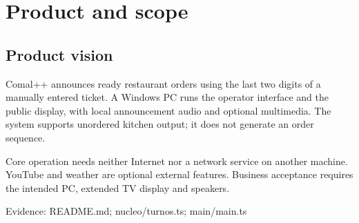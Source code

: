 \section{Product and scope}
\subsection{Product vision}

Comal++ announces ready restaurant orders using the last two digits of a manually entered ticket. A Windows PC runs the operator interface and the public display, with local announcement audio and optional multimedia. The system supports unordered kitchen output; it does not generate an order sequence.

Core operation needs neither Internet nor a network service on another machine. YouTube and weather are optional external features. Business acceptance requires the intended PC, extended TV display and speakers.

Evidence: README.md; nucleo/turnos.ts; main/main.ts
